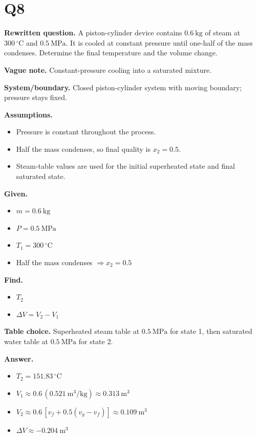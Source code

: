 \section*{Q8}
\textbf{Rewritten question.} A piston-cylinder device contains $0.6\ \mathrm{kg}$ of steam at $300\,^{\circ}\mathrm{C}$ and $0.5\ \mathrm{MPa}$. It is cooled at constant pressure until one-half of the mass condenses. Determine the final temperature and the volume change.

\textbf{Vague note.} Constant-pressure cooling into a saturated mixture.

\textbf{System/boundary.} Closed piston-cylinder system with moving boundary; pressure stays fixed.

\textbf{Assumptions.}
\begin{itemize}
  \item Pressure is constant throughout the process.
  \item Half the mass condenses, so final quality is $x_2 = 0.5$.
  \item Steam-table values are used for the initial superheated state and final saturated state.
\end{itemize}

\textbf{Given.}
\begin{itemize}
  \item $m = 0.6\ \mathrm{kg}$
  \item $P = 0.5\ \mathrm{MPa}$
  \item $T_1 = 300\,^{\circ}\mathrm{C}$
  \item Half the mass condenses $
    \Rightarrow x_2 = 0.5$
\end{itemize}

\textbf{Find.}
\begin{itemize}
  \item $T_2$
  \item $\Delta V = V_2 - V_1$
\end{itemize}

\textbf{Table choice.} Superheated steam table at $0.5\ \mathrm{MPa}$ for state 1, then saturated water table at $0.5\ \mathrm{MPa}$ for state 2.

\textbf{Answer.}
\begin{itemize}
  \item $T_2 = 151.83\,^{\circ}\mathrm{C}$
  \item $V_1 \approx 0.6\,(0.521\ \mathrm{m^3/kg}) \approx 0.313\ \mathrm{m^3}$
  \item $V_2 \approx 0.6\,[v_f + 0.5(v_g-v_f)] \approx 0.109\ \mathrm{m^3}$
  \item $\Delta V \approx -0.204\ \mathrm{m^3}$
\end{itemize}

